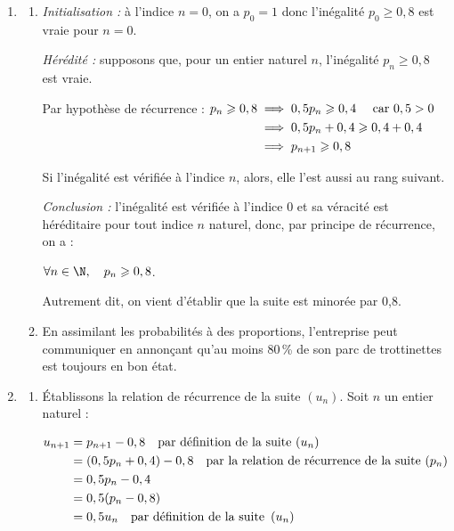 \begin{enumerate}
$p_{n+1} = P(B_{n+1}) = P\Big(B_n \cap B_{n+1}\Big) + P\Big(\overline{B_n} \cap B_{n+1} \Big) = p_n \times 0,9 + (1-p_n) \times 0,4 = 0,9p_n + 0,4 - 0,4p_n $

Donc on a bien $p_{n+1} = 0,5p_n + 0,4$ : on a donc bien établi la relation de récurrence annoncée.

\item 
	\begin{enumerate}
		\item \emph{Initialisation :} à l'indice $n=0$, on a $p_0 = 1$ donc l'inégalité $p_0 \geqslant 0,8$ est vraie pour $n = 0$.

\emph{Hérédité :} supposons que, pour un entier naturel $n$, l'inégalité $p_n \geqslant 0,8$ est vraie.

Par hypothèse de récurrence : $\aligned[t] p_n \geqslant 0,8 &\implies 0,5p_n \geqslant 0,4 \quad \text{ car } 0,5 > 0\\
				&\implies 0,5p_n + 0,4 \geqslant 0,4 + 0,4\\
				&\implies p_{n+1} \geqslant 0,8\\ \endaligned$

Si l'inégalité est vérifiée à l'indice $n$, alors, elle l'est aussi au rang suivant.


\emph{Conclusion :} l'inégalité est vérifiée à l'indice 0 et sa véracité est héréditaire pour tout indice $n$ naturel, donc, par principe de récurrence, on a :

$\forall n \in \N, \quad p_n \geqslant 0,8$.

Autrement dit, on vient d'établir que la suite est minorée par 0,8.

		\item En assimilant les probabilités à des proportions, l'entreprise peut communiquer en annonçant qu'au moins 80\,\% de son parc de trottinettes est toujours en bon état.
\end{enumerate}
\item 
		\begin{enumerate}
			\item Établissons la relation de récurrence de la suite $\left(u_n\right)$. Soit $n$ un entier naturel :

$\aligned u_{n+1} &= p_{n+1} - 0,8 \quad \text{par définition de la suite } (u_n)\\
&= (0,5p_n + 0,4) - 0,8 \quad \text{par la relation de récurrence de la suite } (p_n)\\
&= 0,5p_n - 0,4\\
&= 0,5(p_n - 0,8)\\
&= 0,5u_n \quad \text{par définition de la suite } \left(u_n\right)\\ \endaligned$


\end{enumerate}
\end{enumerate}

